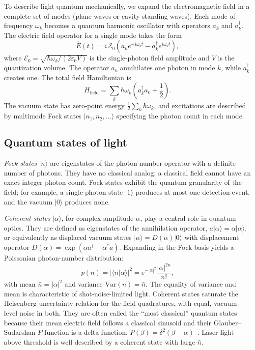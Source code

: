 \documentclass[%
 reprint,
 amsmath,amssymb,
 aps,
 floatfix,
]{revtex4-2}
\begin{document}
To describe light quantum mechanically, we expand the electromagnetic field in a complete set of modes (plane waves or cavity standing waves). Each mode of frequency $\omega_k$ becomes a quantum harmonic oscillator with operators $a_k$ and $a_k^\dagger$. The electric field operator for a single mode takes the form
\begin{equation}
\hat{E}(t) = i\, \mathcal{E}_0 \left( a_k e^{-i \omega_k t} - a_k^\dagger e^{i \omega_k t} \right),
\label{eq:efield}
\end{equation}
where $\mathcal{E}_0 = \sqrt{\hbar \omega_k / (2 \varepsilon_0 V)}$ is the single-photon field amplitude and $V$ is the quantization volume. The operator $a_k$ annihilates one photon in mode $k$, while $a_k^\dagger$ creates one. The total field Hamiltonian is
\begin{equation}
H_{\text{field}} = \sum_k \hbar \omega_k \left( a_k^\dagger a_k + \frac{1}{2} \right).
\label{eq:Hfield}
\end{equation}
The vacuum state has zero-point energy $\tfrac{1}{2} \sum_k \hbar \omega_k$, and excitations are described by multimode Fock states $|n_1, n_2, \ldots\rangle$ specifying the photon count in each mode.


\subsection{Quantum states of light}
\label{sec:states}

\textit{Fock states} $|n\rangle$ are eigenstates of the photon-number operator with a definite number of photons. They have no classical analog: a classical field cannot have an exact integer photon count. Fock states exhibit the quantum granularity of the field; for example, a single-photon state $|1\rangle$ produces at most one detection event, and the vacuum $|0\rangle$ produces none.

\textit{Coherent states} $|\alpha\rangle$, for complex amplitude $\alpha$, play a central role in quantum optics. They are defined as eigenstates of the annihilation operator, $a|\alpha\rangle = \alpha|\alpha\rangle$, or equivalently as displaced vacuum states $|\alpha\rangle = D(\alpha)|0\rangle$ with displacement operator $D(\alpha) = \exp(\alpha a^\dagger - \alpha^* a)$. Expanding in the Fock basis yields a Poissonian photon-number distribution:
\begin{equation}
p(n) = |\langle n|\alpha\rangle|^2 = e^{-|\alpha|^2} \frac{|\alpha|^{2n}}{n!},
\label{eq:poisson}
\end{equation}
with mean $\bar{n} = |\alpha|^2$ and variance $\mathrm{Var}(n) = \bar{n}$. The equality of variance and mean is characteristic of shot-noise-limited light. Coherent states saturate the Heisenberg uncertainty relation for the field quadratures, with equal, vacuum-level noise in both. They are often called the ``most classical'' quantum states because their mean electric field follows a classical sinusoid and their Glauber--Sudarshan $P$ function is a delta function, $P(\beta) = \delta^2(\beta - \alpha)$~\cite{glauber1963, sudarshan1963}. Laser light above threshold is well described by a coherent state with large $\bar{n}$.
\end{document}
